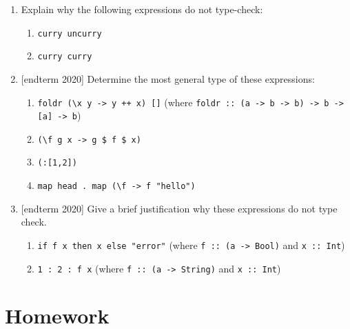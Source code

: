 \documentclass{article}
\def\code#1{\texttt{#1}}
\begin{document}
\begin{enumerate}
    \item \cite[p. 319]{thompson} Explain why the following expressions do not type-check:
        \begin{enumerate}
            \item \code{curry uncurry}
            \item \code{curry curry}
        \end{enumerate}

    \item {[endterm 2020]} Determine the most general type of these expressions:
        \begin{enumerate}
            \item \code{foldr (\textbackslash x y -> y ++ x) []} (where \code{foldr :: (a -> b -> b) -> b -> [a] -> b})
            \item \code{(\textbackslash f g x -> g \$ f \$ x)}
            \item \code{(:[1,2])}
            \item \code{map head . map (\textbackslash f -> f "hello")}
        \end{enumerate}

    \item {[endterm 2020]} Give a brief justification why these expressions do not type check.
        \begin{enumerate}
            \item \code{if f x then x else "error"} (where \code{f :: (a -> Bool)} and \code{x :: Int})
            \item \code{1 : 2 : f x} (where \code{f :: (a -> String)} and \code{x :: Int})
        \end{enumerate}
\end{enumerate}

\section{Homework}

\printbibliography
\end{document}
